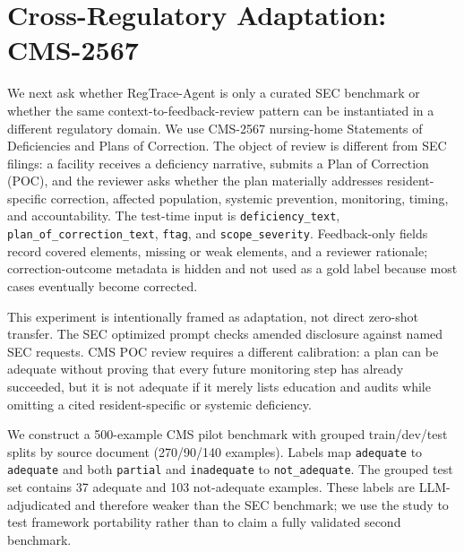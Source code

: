 \documentclass[11pt]{article}
\newcommand{\framework}{RegTrace-Agent}
\begin{document}
\section{Cross-Regulatory Adaptation: CMS-2567}
\label{sec:cms}

We next ask whether \framework{} is only a curated SEC benchmark or whether the same context-to-feedback-review pattern can be instantiated in a different regulatory domain. We use CMS-2567 nursing-home Statements of Deficiencies and Plans of Correction. The object of review is different from SEC filings: a facility receives a deficiency narrative, submits a Plan of Correction (POC), and the reviewer asks whether the plan materially addresses resident-specific correction, affected population, systemic prevention, monitoring, timing, and accountability. The test-time input is \texttt{deficiency\_text}, \texttt{plan\_of\_correction\_text}, \texttt{ftag}, and \texttt{scope\_severity}. Feedback-only fields record covered elements, missing or weak elements, and a reviewer rationale; correction-outcome metadata is hidden and not used as a gold label because most cases eventually become corrected.

This experiment is intentionally framed as adaptation, not direct zero-shot transfer. The SEC optimized prompt checks amended disclosure against named SEC requests. CMS POC review requires a different calibration: a plan can be adequate without proving that every future monitoring step has already succeeded, but it is not adequate if it merely lists education and audits while omitting a cited resident-specific or systemic deficiency.

We construct a 500-example CMS pilot benchmark with grouped train/dev/test splits by source document (270/90/140 examples). Labels map \texttt{adequate} to \texttt{adequate} and both \texttt{partial} and \texttt{inadequate} to \texttt{not\_adequate}. The grouped test set contains 37 adequate and 103 not-adequate examples. These labels are LLM-adjudicated and therefore weaker than the SEC benchmark; we use the study to test framework portability rather than to claim a fully validated second benchmark.
\end{document}
